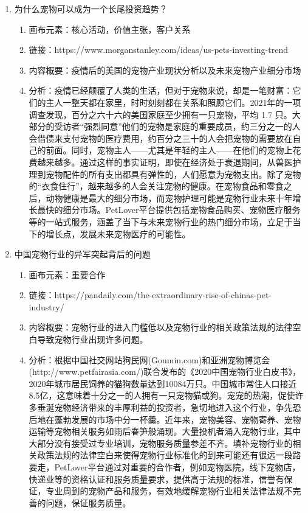 \documentclass[a4paper]{ctexart}
\begin{document}
\begin{enumerate}[label=\alph*.]
  \item 为什么宠物可以成为一个长尾投资趋势？
  \begin{enumerate}[label=\alph*.]
    \item 画布元素：核心活动，价值主张，客户关系
    \item 链接：https://www.morganstanley.com/ideas/us-pets-investing-trend
    \item 内容概要：疫情后的美国的宠物产业现状分析以及未来宠物产业细分市场
    \item 分析：疫情已经颠覆了人类的生活，但对于宠物来说，却是一笔财富：它们的主人一整天都在家里，时时刻刻都在关系和照顾它们。2021年的一项调查发现，百分之六十六的美国家庭至少拥有一只宠物，平均 1.7 只。大部分的受访者“强烈同意”他们的宠物是家庭的重要成员，约三分之一的人会借债来支付宠物的医疗费用，约百分之三十的人会把宠物的需要放在自己的前面。同时，宠物主人——尤其是年轻的主人——在他们的宠物上花费越来越多。通过这样的事实证明，即使在经济处于衰退期间，从兽医护理到宠物配件的所有支出都具有弹性的，人们愿意为宠物支出。除了宠物的“衣食住行”，越来越多的人会关注宠物的健康。在宠物食品和零食之后，动物健康是最大的细分市场，而宠物护理可能是宠物行业未来十年增长最快的细分市场。PetLover平台提供包括宠物食品购买、宠物医疗服务等的一站式服务，涵盖了当下与未来宠物行业的热门细分市场，立足于当下的增长点，发展未来宠物医疗的可能性。
  \end{enumerate}
  \item 中国宠物行业的异军突起背后的问题
  \begin{enumerate}[label=\alph*.]
    \item 画布元素：重要合作
    \item 链接：https://pandaily.com/the-extraordinary-rise-of-chinas-pet-industry/
    \item 内容概要：宠物行业的进入门槛低以及宠物行业的相关政策法规的法律空白导致宠物行业出现许多问题。
    \item 分析：根据中国社交网站狗民网(Goumin.com)和亚洲宠物博览会(http://www.petfairasia.com/)联合发布的《2020中国宠物行业白皮书》，2020年城市居民饲养的猫狗数量达到10084万只。中国城市常住人口接近8.5亿，这意味着十分之一的人拥有一只宠物猫或狗。宠宠的热潮，促使许多垂涎宠物经济带来的丰厚利益的投资者，急切地进入这个行业，争先恐后地在蓬勃发展的市场中分一杯羹。近年来，宠物美容、宠物寄养、宠物运输等宠物相关服务如雨后春笋般涌现。大量投机者涌入宠物行业，其中大部分没有接受过专业培训，宠物服务质量参差不齐。填补宠物行业的相关政策法规的法律空白来使得宠物行业标准化的到来可能还有很远一段路要走，PetLover平台通过对重要的合作者，例如宠物医院，线下宠物店，快递业等的资格认证和服务质量要求，提供高于法规的标准，信誉有保证，专业周到的宠物产品和服务，有效地缓解宠物行业相关法律法规不完善的问题，保证服务质量。

\end{enumerate}
\end{enumerate}
\end{document}
